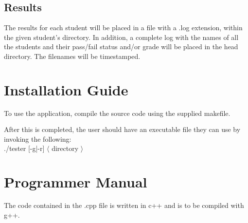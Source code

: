 \subsection{Results}
The results for each student will be placed in a file with a .log extension, within the given student's directory. 
In addition, a complete log with the names of all the students and their pass/fail status and/or grade will be placed 
in the head directory. The filenames will be timestamped.


\section{Installation Guide}
To use the application, compile the source code using the supplied makefile.

After this is completed, the user should have an
executable file they can use by invoking the following: \\
./tester [-g|-r] $\langle$ directory $\rangle$

\section{Programmer Manual}
The code contained in the .cpp file is written in c++ and is to be compiled with g++. 
